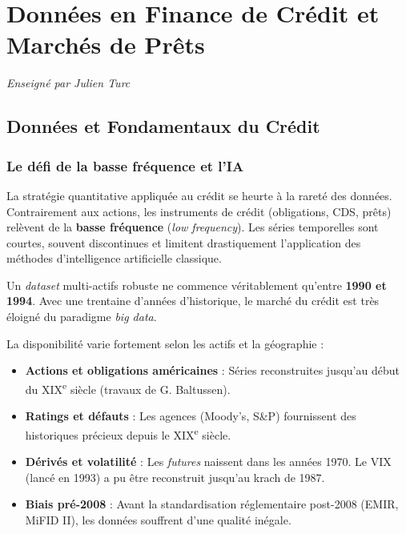 \chapter{Données en Finance de Crédit et Marchés de Prêts}
\label{chap:donnees_credit}
\textit{Enseigné par Julien Turc}

\section{Données et Fondamentaux du Crédit}

\subsection{Le défi de la basse fréquence et l'IA}
La stratégie quantitative appliquée au crédit se heurte à la rareté des données. Contrairement aux actions, les instruments de crédit (obligations, CDS, prêts) relèvent de la \textbf{basse fréquence} (\textit{low frequency}). Les séries temporelles sont courtes, souvent discontinues et limitent drastiquement l'application des méthodes d'intelligence artificielle classique. 

\begin{remarque}
Un \textit{dataset} multi-actifs robuste ne commence véritablement qu'entre \textbf{1990 et 1994}. Avec une trentaine d'années d'historique, le marché du crédit est très éloigné du paradigme \textit{big data}.
\end{remarque}

La disponibilité varie fortement selon les actifs et la géographie :
\begin{itemize}
    \item \textbf{Actions et obligations américaines} : Séries reconstruites jusqu'au début du XIX\textsuperscript{e} siècle (travaux de G. Baltussen). 
    \item \textbf{Ratings et défauts} : Les agences (Moody's, S\&P) fournissent des historiques précieux depuis le XIX\textsuperscript{e} siècle.
    \item \textbf{Dérivés et volatilité} : Les \textit{futures} naissent dans les années 1970. Le VIX (lancé en 1993) a pu être reconstruit jusqu'au krach de 1987.
    \item \textbf{Biais pré-2008} : Avant la standardisation réglementaire post-2008 (EMIR, MiFID II), les données souffrent d'une qualité inégale.
\end{itemize}

